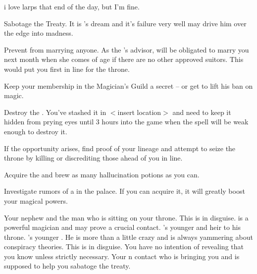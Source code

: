 i love larps that end of the day, but I'm fine.\documentclass[char]{NeptuneBall}
\begin{document}
\begin{itemz}[Goals]
  \item Sabotage the Treaty. It is \cKing{}'s dream and it's failure very well may drive him over the edge into madness.
  \item Prevent \cPrincess{} from marrying anyone. As the \cKing{\King}'s advisor, \cPrincess{\they} will be obligated to marry you next month when she comes of age if there are no other approved suitors. This would put you first in line for the throne.
  \item Keep your membership in the Magician's Guild a secret -- or get \cKing{\King} \cKing{} to lift his ban on magic.
  \item Destroy the \iMusicBox{}. You've stashed it in $<$insert location$>$ and need to keep it hidden from prying eyes until 3 hours into the game when the spell will be weak enough to destroy it.
  \item If the opportunity arises, find proof of your lineage and attempt to seize the throne by killing or discrediting those ahead of you in line.
  \item Acquire the \iHemlock{} and brew as many hallucination potions as you can.
  \item Investigate rumors of a \iGlowShell{\MYname} in the palace. If you can acquire it, it will greatly boost your magical powers.
\end{itemz}

\begin{contacts}
  \contact{\cKing{}} Your nephew and the man who is sitting on your throne.
  \contact{\cWitch{\MYname}} This is \cWitch{} in disguise. \cWitch{\They} is a powerful magician and may prove a crucial contact.
  \contact{\cPrincess{}} \cKing{}'s younger \cPrincess{\offspring} and heir to his throne.
  \contact{\cPlant{}} \cKing{}'s younger \cPlant{\sibling}. He is more than a little crazy and is always yammering about conspiracy theories.
  \contact{\cQueen{\MYname}} This is \cQueen{} in disguise. You have no intention of revealing that you know \cQueen{\them} unless strictly necessary.
  \contact{\cSpy{}} Your \pPacifica{}n contact who is bringing you \iHemlock{} and is supposed to help you sabatoge the treaty.
\end{contacts}
\end{document}
